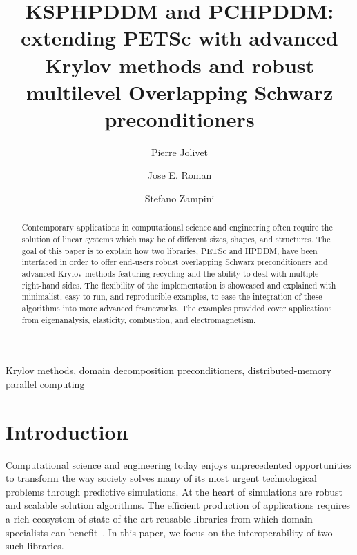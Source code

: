 \documentclass[3p,11pt]{elsarticle}
\begin{document}
\begin{frontmatter}

\title{KSPHPDDM and PCHPDDM: extending PETS\MakeLowercase{c} with advanced Krylov methods and robust multilevel Overlapping Schwarz preconditioners}

\author[firstaddress]{Pierre Jolivet}

\author[secondaryaddress]{Jose E. Roman}

\author[thirdaddress]{Stefano Zampini}

\address[firstaddress]{CNRS, IRIT--ENSEEIHT, Toulouse, France}
\address[secondaryaddress]{Universitat Polit\`ecnica de Val\`encia, Val\`encia, Spain}
\address[thirdaddress]{King Abdullah University of Science and Technology, Thuwal, Saudi Arabia}

\begin{abstract}
  Contemporary applications in computational science and engineering often
    require the solution of linear systems which may be of different sizes,
    shapes, and structures. The goal of this paper is to explain how two
    libraries, PETSc and HPDDM, have been interfaced in order to offer
    end-users robust overlapping Schwarz preconditioners and advanced Krylov
    methods featuring recycling and the ability to deal with multiple right-hand sides.
    The flexibility of the implementation %
    is showcased and explained with minimalist, easy-to-run, and reproducible examples,
    to ease the integration of these algorithms into more advanced frameworks.
    The examples provided cover applications from
    eigenanalysis, elasticity, combustion, and
    electromagnetism.
\end{abstract}

\begin{keywords}
  Krylov methods, domain decomposition preconditioners, distributed-memory parallel computing
\end{keywords}

\end{frontmatter}

\linenumbers

\section{Introduction}
Computational science and engineering today enjoys unprecedented opportunities to transform
the way society solves many of its most urgent technological problems through predictive simulations.
At the heart of simulations are robust and scalable solution algorithms. The efficient
production of applications requires a rich ecosystem of state-of-the-art
reusable libraries from which domain
specialists can benefit~\cite{Bartlett:2017:XFT}. In this paper, we focus on the interoperability of two such
libraries.
\end{document}
